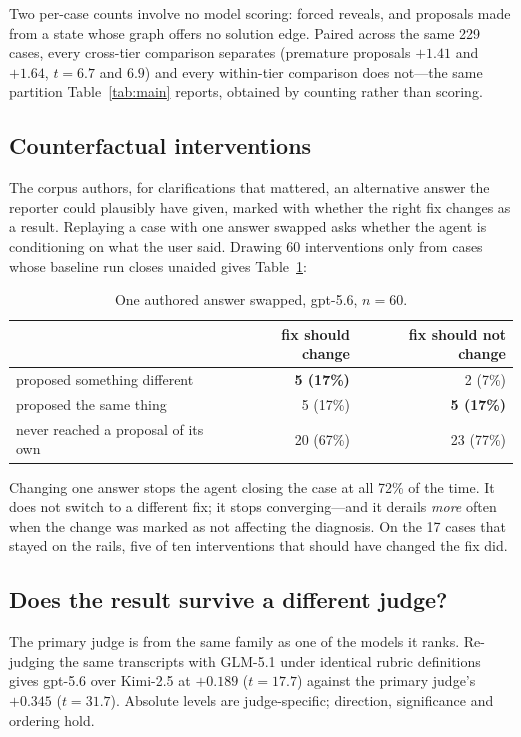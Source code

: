 \documentclass{article}
\begin{document}
Two per-case counts involve no model scoring: forced reveals, and
proposals made from a state whose graph offers no solution edge. Paired
across the same 229 cases, every cross-tier comparison separates
(premature proposals $+1.41$ and $+1.64$, $t = 6.7$ and $6.9$) and every
within-tier comparison does not---the same partition
Table~\ref{tab:main} reports, obtained by counting rather than scoring.

\subsection{Counterfactual interventions}
\label{sec:cf}

The corpus authors, for clarifications that mattered, an alternative
answer the reporter could plausibly have given, marked with whether the
right fix changes as a result. Replaying a case with one answer swapped
asks whether the agent is conditioning on what the user said. Drawing 60
interventions only from cases whose baseline run closes unaided gives
Table~\ref{tab:cf}:

\begin{table}[h]
\caption{One authored answer swapped, gpt-5.6, $n=60$.}
\label{tab:cf}
\centering
\begin{tabular}{lrr}
\toprule
 & fix should change & fix should not change \\
\midrule
proposed something different & \textbf{5 (17\%)} & 2 (7\%) \\
proposed the same thing & 5 (17\%) & \textbf{5 (17\%)} \\
never reached a proposal of its own & 20 (67\%) & 23 (77\%) \\
\bottomrule
\end{tabular}
\end{table}

Changing one answer stops the agent closing the case at all 72\% of the
time. It does not switch to a different fix; it stops converging---and it
derails \emph{more} often when the change was marked as not affecting the
diagnosis. On the 17 cases that stayed on the rails, five of ten
interventions that should have changed the fix did.

\subsection{Does the result survive a different judge?}

The primary judge is from the same family as one of the models it ranks.
Re-judging the same transcripts with GLM-5.1 under identical rubric
definitions gives gpt-5.6 over Kimi-2.5 at $+0.189$ ($t = 17.7$) against
the primary judge's $+0.345$ ($t = 31.7$). Absolute levels are
judge-specific; direction, significance and ordering hold.
\end{document}

